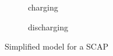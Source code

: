 \begin{figure}[h!]
	\centering
  	\begin{subfigure}[t]{0.49\textwidth}
		\centering
	   	\caption{charging}
	\end{subfigure}
	\begin{subfigure}[t]{0.49\textwidth}
	 	\centering
	    \caption{discharging}
	\end{subfigure}
	\caption{Simplified model for a SCAP}
\end{figure}


